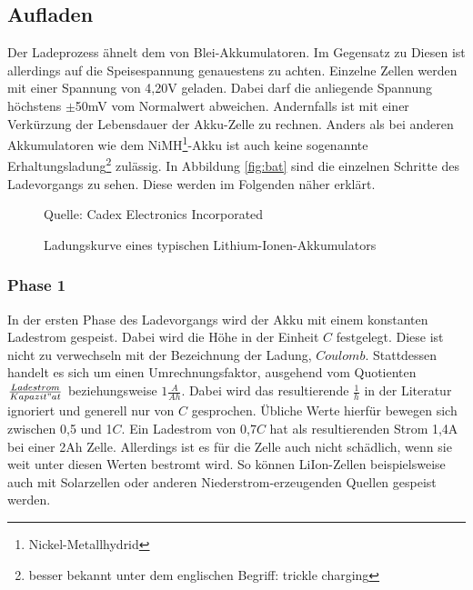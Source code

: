 \documentclass[12pt]{scrreprt} %
\begin{document}
\subsection{Aufladen}
Der Ladeprozess ähnelt dem von Blei-Akkumulatoren. Im Gegensatz zu Diesen ist allerdings auf die Speisespannung genauestens zu achten. Einzelne Zellen werden mit einer Spannung von 4,20V geladen. Dabei darf die anliegende Spannung höchstens $\pm$50mV vom Normalwert abweichen. Andernfalls ist mit einer Verkürzung der Lebensdauer der Akku-Zelle zu rechnen. Anders als bei anderen Akkumulatoren wie dem NiMH\footnote{Nickel-Metallhydrid}-Akku ist auch keine sogenannte Erhaltungsladung\footnote{besser bekannt unter dem englischen Begriff: trickle charging} zulässig. In Abbildung \vref{fig:bat} sind die einzelnen Schritte des Ladevorgangs zu sehen. Diese werden im Folgenden näher erklärt.
\begin {figure}[htbp]
      \begin{center}
      \end{center}
\caption{Ladungskurve eines typischen Lithium-Ionen-Akkumulators}
\centering
Quelle: Cadex Electronics Incorporated \citep{BAT}
\label{fig:bat}
\end{figure}
\subsubsection{Phase 1}
In der ersten Phase des Ladevorgangs wird der Akku mit einem konstanten Ladestrom gespeist. Dabei wird die Höhe in der Einheit $C$ festgelegt. Diese ist nicht zu verwechseln mit der Bezeichnung der Ladung, $Coulomb$. Stattdessen handelt es sich um einen Umrechnungsfaktor, ausgehend vom Quotienten $\frac{Ladestrom}{Kapazit"at}$ beziehungsweise $1\frac{A}{Ah}$. Dabei wird das resultierende $\frac{1}{h}$ in der Literatur ignoriert und generell nur von $C$ gesprochen. Übliche Werte hierfür bewegen sich zwischen 0,5 und 1$C$. Ein Ladestrom von 0,7$C$ hat als resultierenden Strom 1,4A bei einer 2Ah Zelle. Allerdings ist es für die Zelle auch nicht schädlich, wenn sie weit unter diesen Werten bestromt wird. So können LiIon-Zellen beispielsweise auch mit Solarzellen oder anderen Niederstrom-erzeugenden Quellen gespeist werden.
\end{document}
